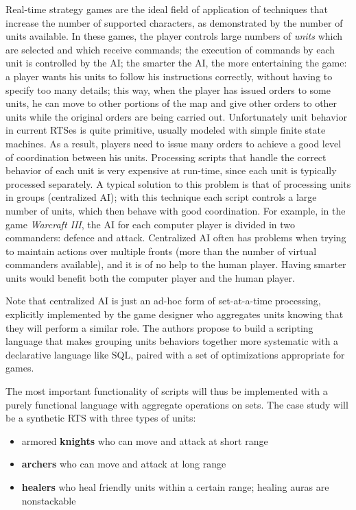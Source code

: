 %
%

Real-time strategy games are the ideal field of application of techniques that increase the number of supported characters, as demonstrated by the number of units available. In these games, the player controls large numbers of \textit{units} which are selected and which receive commands; the execution of commands by each unit is controlled by the AI; the smarter the AI, the more entertaining the game: a player wants his units to follow his instructions correctly, without having to specify too many details; this way, when the player has issued orders to some units, he can move to other portions of the map and give other orders to other units while the original orders are being carried out. Unfortunately unit behavior in current RTSes is quite primitive, usually modeled with simple finite state machines. As a result, players need to issue many orders to achieve a good level of coordination between his units. Processing scripts that handle the correct behavior of each unit is very expensive at run-time, since each unit is typically processed separately. A typical solution to this problem is that of processing units in groups (centralized AI); with this technique each script controls a large number of units, which then behave with good coordination. For example, in the game \textit{Warcraft III}, the AI for each computer player is divided in two commanders: defence and attack. Centralized AI often has problems when trying to maintain actions over multiple fronts (more than the number of virtual commanders available), and it is of no help to the human player. Having smarter units would benefit both the computer player and the human player.

Note that centralized AI is just an ad-hoc form of set-at-a-time processing, explicitly implemented by the game designer who aggregates units knowing that they will perform a similar role. The authors propose to build a scripting language that makes grouping units behaviors together more systematic with a declarative language like SQL, paired with a set of optimizations appropriate for games.

The most important functionality of scripts will thus be implemented with a purely functional language with aggregate operations on sets. The case study will be a synthetic RTS with three types of units:

\begin{itemize}
\item armored \textbf{knights} who can move and attack at short range
\item \textbf{archers} who can move and attack at long range
\item \textbf{healers} who heal friendly units within a certain range; healing auras are nonstackable
\end{itemize}

